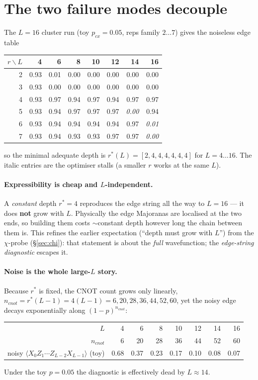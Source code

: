 \documentclass[11pt]{article}
\newcommand{\Oedge}{X_0 Z_1\cdots Z_{L-2} X_{L-1}}
\newcommand{\expv}[1]{\langle #1\rangle}
\begin{document}
\section{The two failure modes decouple}
The $L=16$ cluster run (toy $p_{cx}=0.05$, reps family $2\ldots7$) gives the
noiseless edge table
\begin{center}
\begin{tabular}{rrrrrrrr}
\toprule
$r\backslash L$ & 4 & 6 & 8 & 10 & 12 & 14 & 16 \\
\midrule
2 & 0.93 & 0.01 & 0.00 & 0.00 & 0.00 & 0.00 & 0.00 \\
3 & 0.93 & 0.00 & 0.00 & 0.00 & 0.00 & 0.00 & 0.00 \\
4 & 0.93 & 0.97 & 0.94 & 0.97 & 0.94 & 0.97 & 0.97 \\
5 & 0.93 & 0.94 & 0.97 & 0.97 & 0.97 & \emph{0.00} & 0.94 \\
6 & 0.93 & 0.94 & 0.94 & 0.94 & 0.94 & 0.97 & \emph{0.01} \\
7 & 0.93 & 0.94 & 0.93 & 0.93 & 0.97 & 0.97 & \emph{0.00} \\
\bottomrule
\end{tabular}
\end{center}
so the minimal adequate depth is
$r^\ast(L)=[2,4,4,4,4,4,4]$ for $L=4\ldots16$. The italic entries are the
optimiser stalls (a smaller $r$ works at the same $L$).

\paragraph{Expressibility is cheap and $L$-independent.} A \emph{constant} depth
$r^\ast=4$ reproduces the edge string all the way to $L=16$ --- it does
\textbf{not} grow with $L$. Physically the edge Majoranas are localised at the two
ends, so building them costs $\sim$constant depth however long the chain between
them is. This refines the earlier expectation (``depth must grow with $L$'') from
the $\chi$-probe (\S\ref{sec:chi}): that statement is about the \emph{full}
wavefunction; the \emph{edge-string diagnostic} escapes it.

\paragraph{Noise is the whole large-$L$ story.} Because $r^\ast$ is fixed, the
CNOT count grows only linearly, $n_{cnot}=r^\ast(L-1)=4(L-1)=6,20,28,36,44,52,60$,
yet the noisy edge decays exponentially along $(1-p)^{n_{cnot}}$:
\begin{center}
\begin{tabular}{rrrrrrrr}
\toprule
$L$ & 4 & 6 & 8 & 10 & 12 & 14 & 16 \\
$n_{cnot}$ & 6 & 20 & 28 & 36 & 44 & 52 & 60 \\
noisy $\expv{\Oedge}$ (toy) & 0.68 & 0.37 & 0.23 & 0.17 & 0.10 & 0.08 & 0.07 \\
\bottomrule
\end{tabular}
\end{center}
Under the toy $p=0.05$ the diagnostic is effectively dead by $L\approx14$.
\end{document}
